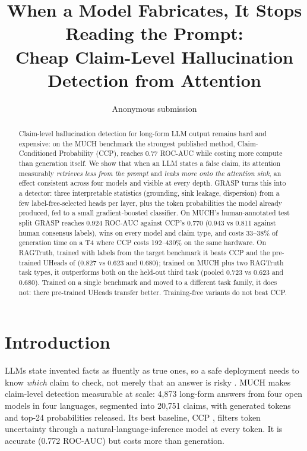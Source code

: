 \documentclass[11pt]{article}
\title{When a Model Fabricates, It Stops Reading the Prompt:\\ Cheap Claim-Level Hallucination Detection from Attention}
\author{Anonymous submission}
\date{}
\begin{document}
\maketitle

\begin{abstract}
Claim-level hallucination detection for long-form LLM output remains hard and expensive: on the
MUCH benchmark the strongest published method, Claim-Conditioned Probability (CCP), reaches
0.77 ROC-AUC while costing more compute than generation itself. We show that when an LLM states a
false claim, its attention measurably \emph{retrieves less from the prompt} and \emph{leaks more onto
the attention sink}, an effect consistent across four models and visible at every depth. GRASP
turns this into a detector: three interpretable statistics (grounding, sink leakage, dispersion)
from a few label-free-selected heads per layer, plus the token probabilities the model already
produced, fed to a small gradient-boosted classifier. On MUCH's human-annotated test split GRASP
reaches 0.924 ROC-AUC against CCP's 0.770 (0.943 vs 0.811 against human consensus labels), wins
on every model and claim type, and costs 33--38\% of generation time on a T4 where CCP costs
192--430\% on the same hardware. On RAGTruth, trained with labels from the target benchmark it
beats CCP and the pre-trained UHeads of \citet{shelmanov-etal-2025-head} (0.827 vs 0.623 and
0.680); trained on MUCH plus two RAGTruth task types, it outperforms both on the held-out third
task (pooled 0.723 vs 0.623 and 0.680). Trained on a single benchmark and moved to a different
task family, it does not: there pre-trained UHeads transfer better. Training-free variants do not
beat CCP.
\end{abstract}

\section{Introduction}
LLMs state invented facts as fluently as true ones, so a safe deployment needs to know \emph{which}
claim to check, not merely that an answer is risky \citep{min-etal-2023-factscore}. MUCH
\citep{dentan2026muchmultilingualclaimhallucination} makes claim-level detection measurable at
scale: 4,873 long-form answers from four open models in four languages, segmented into 20,751
claims, with generated tokens and top-24 probabilities released. Its best baseline, CCP
\citep{fadeeva-etal-2024-fact}, filters token uncertainty through a natural-language-inference
model at every token. It is accurate (0.772 ROC-AUC) but costs more than generation.
\end{document}
